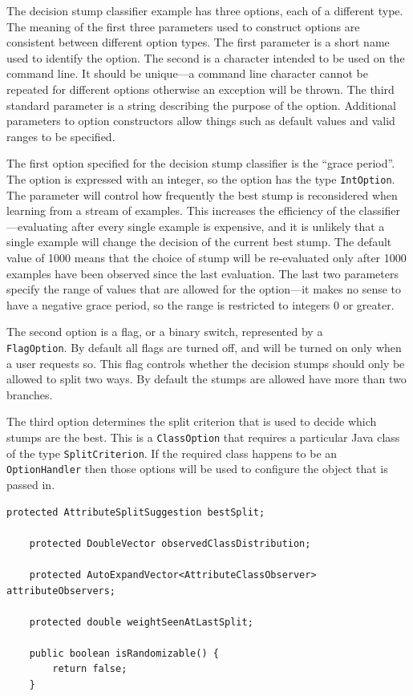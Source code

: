 \documentclass[a4paper,12pt]{article}
\begin{document}
The decision stump classifier example has three options, each of a different type.
The meaning of the first three parameters used to construct options are consistent between different option types. The first parameter is a short name used to identify the option. The second is a character intended to be used on the command line. It should be unique---a command line character cannot be repeated for different options otherwise an exception will be thrown. The third standard parameter is a string describing the purpose of the option. Additional parameters to option constructors allow things such as default values and valid ranges to be specified.

The first option specified for the decision stump classifier is the ``grace period''. The option is expressed with an integer, so the option has the type \verb+IntOption+. The parameter will control how frequently the best stump is reconsidered when learning from a stream of examples. This increases the efficiency of the classifier---evaluating after every single example is expensive, and it is unlikely that a single example will change the decision of the current best stump. The default value of 1000 means that the choice of stump will be re-evaluated only after 1000 examples have been observed since the last evaluation. The last two parameters specify the range of values that are allowed for the option---it makes no sense to have a negative grace period, so the range is restricted to integers 0 or greater.

The second option is a flag, or a binary switch, represented by a \\ \verb+FlagOption+. By default all flags are turned off, and will be turned on only when a user requests so. This flag controls whether the decision stumps should only be allowed to split two ways. By default the stumps are allowed have more than two branches.

The third option determines the split criterion that is used to decide which stumps are the best. This is a \verb+ClassOption+ that requires a particular Java class of the type \verb+SplitCriterion+. If the required class happens to be an \verb+OptionHandler+ then those options will be used to configure the object that is passed in.

\begin{lstlisting}[caption={Miscellaneous fields},label=lst:miscfields,firstnumber=25]
	protected AttributeSplitSuggestion bestSplit;

	protected DoubleVector observedClassDistribution;

	protected AutoExpandVector<AttributeClassObserver> attributeObservers;

	protected double weightSeenAtLastSplit;

	public boolean isRandomizable() {
		return false;
	}
\end{lstlisting}
\end{document}
